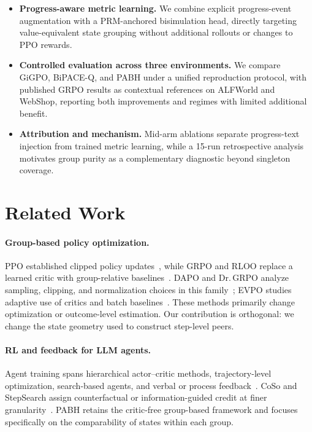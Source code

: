 \documentclass[10pt,twocolumn,letterpaper]{article}
\newcommand{\method}{PABH\xspace}
\begin{document}
\begin{itemize}
\item \textbf{Progress-aware metric learning.} We combine explicit progress-event augmentation with a PRM-anchored bisimulation head, directly targeting value-equivalent state grouping without additional rollouts or changes to PPO rewards.
\item \textbf{Controlled evaluation across three environments.} We compare GiGPO, BiPACE-Q, and \method under a unified reproduction protocol, with published GRPO results as contextual references on ALFWorld and WebShop, reporting both improvements and regimes with limited additional benefit.
\item \textbf{Attribution and mechanism.} Mid-arm ablations separate progress-text injection from trained metric learning, while a 15-run retrospective analysis motivates group purity as a complementary diagnostic beyond singleton coverage.
\end{itemize}

\section{Related Work}
\label{sec:related}

\paragraph{Group-based policy optimization.}
PPO established clipped policy updates~\cite{ppo}, while GRPO and RLOO replace a learned critic with group-relative baselines~\cite{grpo,rloo}. DAPO and Dr.\,GRPO analyze sampling, clipping, and normalization choices in this family~\cite{dapo,drgrpo}; EVPO studies adaptive use of critics and batch baselines~\cite{evpo}. These methods primarily change optimization or outcome-level estimation. Our contribution is orthogonal: we change the state geometry used to construct step-level peers.

\paragraph{RL and feedback for LLM agents.}
Agent training spans hierarchical actor--critic methods, trajectory-level optimization, search-based agents, and verbal or process feedback~\cite{archer,ragen,loop,agentq,searchr1,react,reflexion,text2grad}. CoSo and StepSearch assign counterfactual or information-guided credit at finer granularity~\cite{coso,stepsearch}. \method retains the critic-free group-based framework and focuses specifically on the comparability of states within each group.
\end{document}
